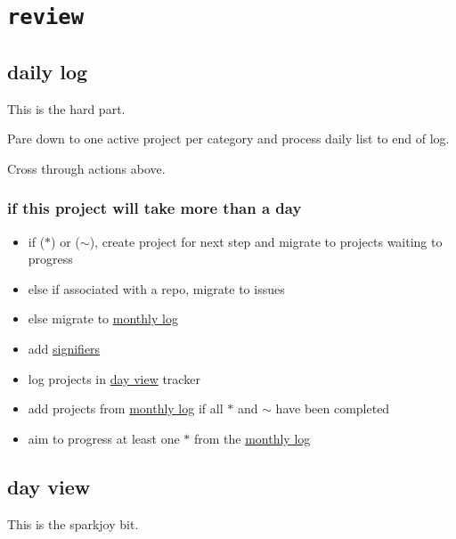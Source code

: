 \documentclass[]{book}
\begin{document}
\hypertarget{review}{%
\section{\texorpdfstring{\textbf{\texttt{review}}}{review}}\label{review}}

\hypertarget{daily-log}{%
\subsection{daily log}\label{daily-log}}

This is the hard part.

Pare down to one active project per category and process daily list to end of log.

Cross through actions above.

\hypertarget{if-this-project-will-take-more-than-a-day}{%
\subsubsection{if this project will take more than a day}\label{if-this-project-will-take-more-than-a-day}}

\begin{itemize}
\item
  if (\(*\)) or (\(\sim\)), create project for next step and migrate to projects waiting to progress
\item
  else if associated with a repo, migrate to issues
\item
  else migrate to \protect\hyperlink{monthly-log}{monthly log}
\item
  add \protect\hyperlink{signifiers}{signifiers}
\item
  log projects in \protect\hyperlink{day-view}{day view} tracker
\item
  add projects from \protect\hyperlink{monthly-log}{monthly log} if all \(*\) and \(\sim\) have been completed
\item
  aim to progress at least one \(*\) from the \protect\hyperlink{monthly-log}{monthly log}
\end{itemize}

\hypertarget{day-view-1}{%
\subsection{day view}\label{day-view-1}}

This is the sparkjoy bit.
\end{document}
